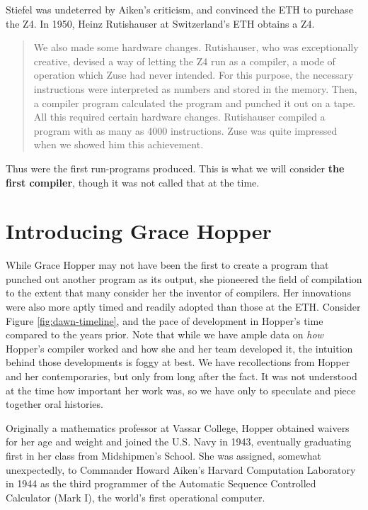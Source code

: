 Stiefel was undeterred by Aiken's criticism, and convinced the ETH to purchase the Z4.
In 1950, Heinz Rutishauser at Switzerland's ETH obtains a Z4.

\begin{quotation}
    We also made some hardware changes. Rutishauser, who was exceptionally creative, devised a way of
letting the Z4 run as a compiler, a mode of operation which Zuse had never intended. For this purpose, the
necessary instructions were interpreted as numbers and stored in the memory. Then, a compiler program
calculated the program and punched it out on a tape. All this required certain hardware changes. Rutishauser
compiled a program with as many as 4000 instructions. Zuse was quite impressed when we showed him this
achievement.\cite{konrad-zuses-z4-2000}
\end{quotation}

Thus were the first run-programs produced.
This is what we will consider \textbf{the first compiler}, though it was not called that at the time.

\section{Introducing Grace Hopper}

While Grace Hopper may not have been the first to create a program that
punched out another program as its output, she pioneered the field of
compilation to the extent that many consider her the inventor of compilers.
Her innovations were also more aptly timed and readily adopted than those at the ETH.
Consider Figure \ref{fig:dawn-timeline}, and the pace of development in Hopper's time
compared to the years prior.
Note that while we have ample data on \textit{how} Hopper's compiler worked and how
she and her team developed it, the intuition behind those developments is foggy at best.
We have recollections from Hopper and her contemporaries, but only from long after the fact.
It was not understood at the time how important her work was, so we have
only to speculate and piece together oral histories.

Originally a mathematics professor at Vassar College, Hopper obtained waivers for her age and weight and
joined the U.S. Navy in 1943, eventually graduating first in her class from Midshipmen's School.
She was assigned, somewhat unexpectedly, to Commander Howard Aiken's Harvard Computation Laboratory in 1944
as the third programmer of the Automatic Sequence Controlled Calculator (Mark I), 
the world's first operational computer.

